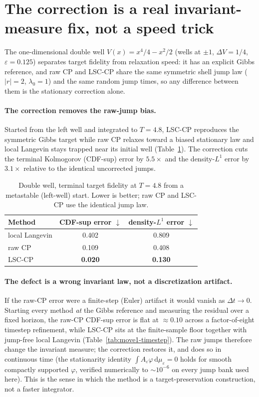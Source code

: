 \section{The correction is a real invariant-measure fix, not a speed trick}
\label{sec:move1}

The one-dimensional double well $V(x)=x^4/4-x^2/2$ (wells at $\pm1$, $\Delta V=1/4$,
$\varepsilon=0.125$) separates target fidelity from relaxation speed: it has an explicit Gibbs
reference, and raw CP and LSC-CP share the same symmetric shell jump law ($|r|=2$, $\lambda_0=1$)
and the same random jump times, so any difference between them is the stationary correction alone.

\paragraph{The correction removes the raw-jump bias.} Started from the left well and integrated to
$T=4.8$, LSC-CP reproduces the symmetric Gibbs target while raw CP relaxes toward a biased
stationary law and local Langevin stays trapped near its initial well (Table~\ref{tab:move1-dw}).
The correction cuts the terminal Kolmogorov (CDF-sup) error by $5.5\times$ and the density-$L^1$
error by $3.1\times$ relative to the identical uncorrected jumps.

\begin{table}[t]
\centering\small
\caption{Double well, terminal target fidelity at $T=4.8$ from a metastable (left-well) start.
Lower is better; raw CP and LSC-CP use the identical jump law.}
\label{tab:move1-dw}
\begin{tabular}{lcc}
\toprule
Method & CDF-sup error $\downarrow$ & density-$L^1$ error $\downarrow$ \\
\midrule
local Langevin & 0.402 & 0.809 \\
raw CP         & 0.109 & 0.408 \\
LSC-CP         & \textbf{0.020} & \textbf{0.130} \\
\bottomrule
\end{tabular}
\end{table}

\paragraph{The defect is a wrong invariant law, not a discretization artifact.} If the raw-CP error
were a finite-step (Euler) artifact it would vanish as $\Delta t\to0$. Starting every method
\emph{at} the Gibbs reference and measuring the residual over a fixed horizon, the raw-CP CDF-sup
error is flat at $\approx0.10$ across a factor-of-eight timestep refinement, while LSC-CP sits at
the finite-sample floor together with jump-free local Langevin (Table~\ref{tab:move1-timestep}).
The raw jumps therefore change the invariant measure; the correction restores it, and does so in
continuous time (the stationarity identity $\int A_\varepsilon\varphi\,\mathrm d\mu_\varepsilon=0$
holds for smooth compactly supported $\varphi$, verified numerically to $\sim10^{-6}$ on every jump
bank used here). This is the sense in which the method is a target-preservation construction, not a
faster integrator.

